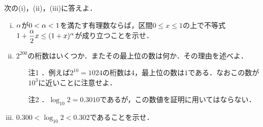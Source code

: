\documentclass[a4j]{jarticle}
\begin{document}

     \begin{oframed}
     次の(i)，(ii)，(iii)に答えよ．
          \begin{enumerate}[(i)]
          \item $\alpha$が$0<\alpha<1$を満たす有理数ならば，区間$0\le x\le1$の上で不等式$1+\dfrac{\alpha}{2}x\le(1+x)^\alpha$が成り立つことを示せ．
          \item $2^{200}$の桁数はいくつか．またその最上位の数は何か．その理由を述べよ．
               \begin{itemize}
               \item[注1]．例えば$2^{10}=1024$の桁数は$4$，最上位の数は$1$である．なおこの数が$10^3$に近いことに注意せよ．
               \item[注2]．$\log_{10}2=0.3010$であるが，この数値を証明に用いてはならない．
               \end{itemize}
          \item $0.300<\log_{10}2<0.302$であることを示せ．
          \end{enumerate}
     \end{oframed}
\end{document}
